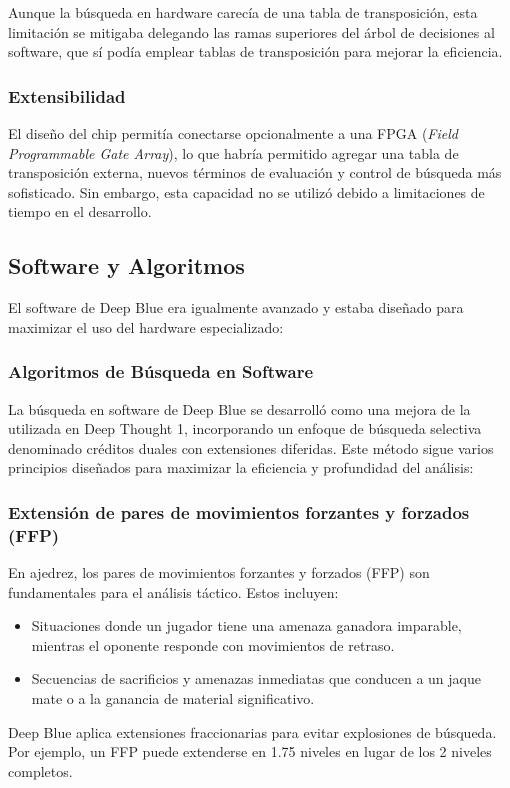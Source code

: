 \documentclass[12pt,a4paper]{article}
\begin{document}
Aunque la búsqueda en hardware carecía de una tabla de transposición, esta limitación se mitigaba delegando las ramas superiores del árbol de decisiones al software, que sí podía emplear tablas de transposición para mejorar la eficiencia.

\subsubsection*{Extensibilidad}
El diseño del chip permitía conectarse opcionalmente a una FPGA (\textit{Field Programmable Gate Array}), lo que habría permitido agregar una tabla de transposición externa, nuevos términos de evaluación y control de búsqueda más sofisticado. Sin embargo, esta capacidad no se utilizó debido a limitaciones de tiempo en el desarrollo.


\subsection{Software y Algoritmos}
El software de Deep Blue era igualmente avanzado y estaba diseñado para maximizar el uso del hardware especializado:

\subsubsection{Algoritmos de Búsqueda en Software}

La búsqueda en software de Deep Blue se desarrolló como una mejora de la utilizada en Deep Thought 1, incorporando un enfoque de búsqueda selectiva denominado créditos duales con extensiones diferidas. Este método sigue varios principios diseñados para maximizar la eficiencia y profundidad del análisis:

\subsubsection*{Extensión de pares de movimientos forzantes y forzados (FFP)}
En ajedrez, los pares de movimientos forzantes y forzados (FFP) son fundamentales para el análisis táctico. Estos incluyen:
\begin{itemize}
    \item Situaciones donde un jugador tiene una amenaza ganadora imparable, mientras el oponente responde con movimientos de retraso.
    \item Secuencias de sacrificios y amenazas inmediatas que conducen a un jaque mate o a la ganancia de material significativo.
\end{itemize}
Deep Blue aplica extensiones fraccionarias para evitar explosiones de búsqueda. Por ejemplo, un FFP puede extenderse en 1.75 niveles en lugar de los 2 niveles completos.
\end{document}
